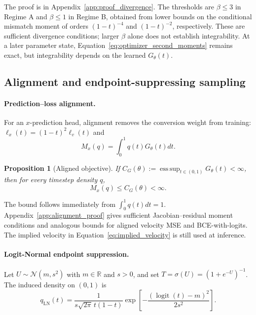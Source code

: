 \documentclass{article}
\theoremstyle{plain}
\newtheorem{proposition}[theorem]{Proposition}
\theoremstyle{definition}
\theoremstyle{remark}
\begin{document}
The proof is in Appendix~\ref{app:proof_divergence}. The thresholds are $\beta\le3$ in Regime A and $\beta\le1$ in Regime B, obtained from lower bounds on the conditional mismatch moment of orders $(1-t)^{-4}$ and $(1-t)^{-2}$, respectively. These are sufficient divergence conditions; larger $\beta$ alone does not establish integrability. At a later parameter state, Equation~\eqref{eq:optimizer_second_moments} remains exact, but integrability depends on the learned $G_\theta(t)$.

\subsection{Alignment and endpoint-suppressing sampling}
\label{sec:alignment_sampling}

\paragraph{Prediction--loss alignment.}
For an $x$-prediction head, alignment removes the conversion weight from training: $\ell_x(t)=(1-t)^2\ell_v(t)$ and
\begin{equation}
M_x(q)=\int_0^1q(t)G_\theta(t)dt.
\label{eq:aligned_identity_moment}
\end{equation}

\begin{proposition}[Aligned objective]
\label{prop:aligned_regularity}
If $C_G(\theta):=\operatorname*{ess\,sup}_{t\in(0,1)}G_\theta(t)<\infty$, then for every timestep density $q$,
\begin{equation}
M_x(q)\le C_G(\theta)<\infty.
\label{eq:aligned_bound}
\end{equation}
\end{proposition}

The bound follows immediately from $\int_0^1q(t)dt=1$. Appendix~\ref{app:alignment_proof} gives sufficient Jacobian--residual moment conditions and analogous bounds for aligned velocity MSE and BCE-with-logits. The implied velocity in Equation~\eqref{eq:implied_velocity} is still used at inference.

\paragraph{Logit-Normal endpoint suppression.}
Let $U\sim\mathcal N(m,s^2)$ with $m\in\mathbb R$ and $s>0$, and set $T=\sigma(U)=(1+e^{-U})^{-1}$. The induced density on $(0,1)$ is
\begin{equation}
q_{\mathrm{LN}}(t)
=\frac{1}{s\sqrt{2\pi}\,t(1-t)}
\exp\left[-\frac{(\operatorname{logit}(t)-m)^2}{2s^2}\right].
\label{eq:lognormal_density}
\end{equation}
\end{document}
